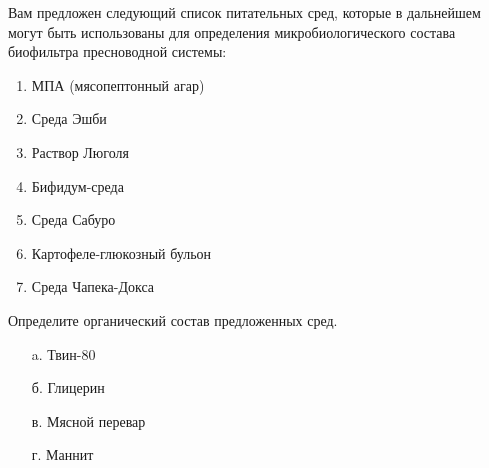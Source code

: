
Вам предложен следующий список питательных сред, которые в дальнейшем могут быть использованы для определения микробиологического состава биофильтра пресноводной системы:

\begin{enumerate}
    \item МПА (мясопептонный агар)
    \item Среда Эшби
    \item Раствор Люголя
    \item Бифидум-среда
    \item Среда Сабуро
    \item Картофеле-глюкозный бульон
    \item Среда Чапека-Докса
\end{enumerate}

Определите органический состав предложенных сред.  

\begin{enumerate}
    \item[a.] Твин-80
    \item[б.] Глицерин
    \item[в.] Мясной перевар
    \item[г.] Маннит
\end{enumerate}
